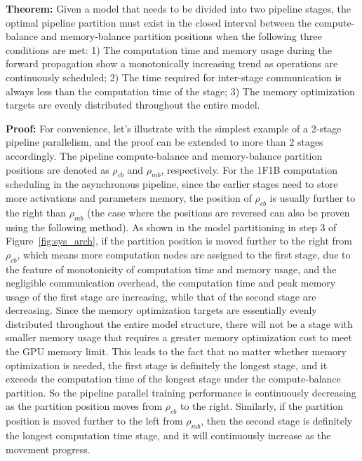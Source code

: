 \textbf{Theorem:} Given a model that needs to be divided into two pipeline stages,
the optimal pipeline partition must exist in the closed interval between the compute-balance and
memory-balance partition positions when the following three conditions are met:
1) The computation time and memory usage during the forward propagation
show a monotonically increasing trend as operations are continuously scheduled;
2) The time required for inter-stage communication is
always less than the computation time of the stage;
3) The memory optimization targets are evenly distributed throughout the entire model.

\textbf{Proof:} For convenience, let's illustrate with the simplest example of a
2-stage pipeline parallelism, and the proof can be extended to more than 2 stages accordingly.
The pipeline compute-balance and memory-balance partition positions
are denoted as $\rho_{cb}$ and $\rho_{mb}$, respectively.
For the 1F1B computation scheduling in the asynchronous pipeline,
since the earlier stages need to store more activations and parameters memory,
the position of $\rho_{cb}$ is usually further to the right than $\rho_{mb}$
(the case where the positions are reversed can also be proven using the following method).
As shown in the model partitioning in step 3 of Figure~\ref{fig:sys_arch},
if the partition position is moved further to the right from $\rho_{cb}$,
which means more computation nodes are assigned to the first stage,
due to the feature of monotonicity of computation time and memory usage,
and the negligible communication overhead,
the computation time and peak memory usage of the first stage are increasing,
while that of the second stage are decreasing.
Since the memory optimization targets are essentially
evenly distributed throughout the entire model structure,
there will not be a stage with smaller memory usage
that requires a greater memory optimization cost to meet the GPU memory limit.
This leads to the fact that no matter whether memory optimization is needed,
the first stage is definitely the longest stage,
and it exceeds the computation time of the longest stage under the compute-balance partition.
So the pipeline parallel training performance is continuously
decreasing as the partition position moves from $\rho_{cb}$ to the right.
Similarly, if the partition position is moved further to the left from $\rho_{mb}$,
then the second stage is definitely the longest computation time stage,
and it will continuously increase as the movement progress.

